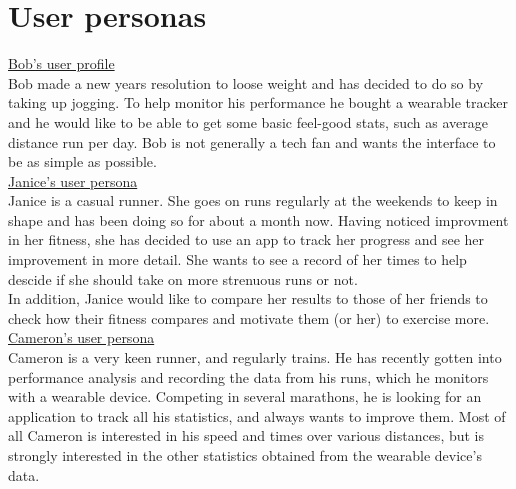 \documentclass{article}
\begin{document}
\section{User personas}
\label{sec:personas}
\underline{Bob's user profile}\\
Bob made a new years resolution to loose weight and has decided to do so by taking up jogging. To help monitor his performance he bought a wearable tracker and he would like to be able to get some basic feel-good stats, such as average distance run per day. Bob is not generally a tech fan and wants the interface to be as simple as possible.\\
\underline{Janice's user persona}\\
Janice is a casual runner. She goes on runs regularly at the weekends to keep in shape and has been doing so for about a month now. Having noticed improvment in her fitness, she has decided to use an app to track her progress and see her improvement in more detail. She wants to see a record of her times to help descide if she should take on more strenuous runs or not.\\
In addition, Janice would like to compare her results to those of her friends to check how their fitness compares and motivate them (or her) to exercise more.\\
\underline{Cameron's user persona}\\
Cameron is a very keen runner, and regularly trains. He has recently gotten into performance analysis and recording the data from his runs, which he monitors with a wearable device. Competing in several marathons, he is looking for an application to track all his statistics, and always wants to improve them. Most of all Cameron is interested in his speed and times over various distances, but is strongly interested in the other statistics obtained from the wearable device's data.\\
\end{document}
